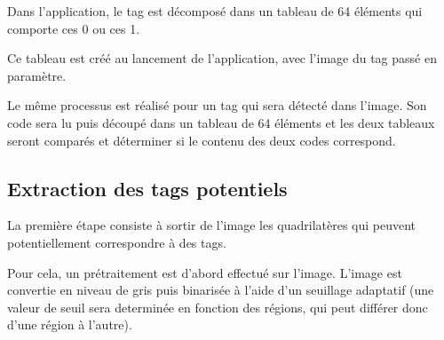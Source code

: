         Dans l'application, le tag est décomposé dans un tableau de 64 éléments qui comporte ces 0 ou ces 1.

        Ce tableau est créé au lancement de l'application, avec l'image du tag passé en paramètre.

        Le même processus est réalisé pour un tag qui sera détecté dans l'image. Son code sera lu puis découpé dans un tableau de 64 éléments et les deux tableaux seront comparés et déterminer si le contenu des deux codes correspond.  

        \subsection{Extraction des tags potentiels}

        La première étape consiste à sortir de l'image les quadrilatères qui peuvent potentiellement correspondre à des tags.

        Pour cela, un prétraitement est d'abord effectué sur l'image. L'image est convertie en niveau de gris puis binarisée à l'aide d'un seuillage adaptatif (une valeur de seuil sera determinée en fonction des régions, qui peut différer donc d'une région à l'autre).

